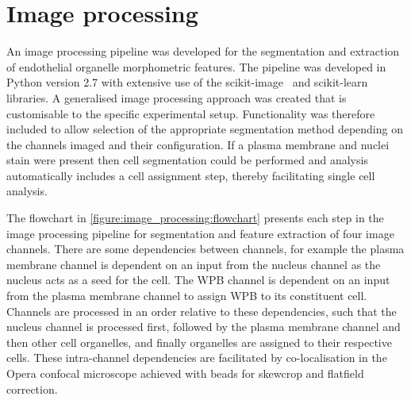 \section{Image processing}
\label{endothelial_morphometry:image_processing}
An image processing pipeline was developed for the segmentation and extraction of endothelial organelle morphometric features. The pipeline was developed in Python version 2.7 with extensive use of the scikit-image~\cite{VanderWalt2014} and scikit-learn~\cite{Pedregosa2011} libraries. A generalised image processing approach was created that is customisable to the specific experimental setup. Functionality was therefore included to allow selection of the appropriate segmentation method depending on the channels imaged and their configuration. If a plasma membrane and nuclei stain were present then cell segmentation could be performed and analysis automatically includes a cell assignment step, thereby facilitating single cell analysis.

The flowchart in \autoref{figure:image_processing:flowchart} presents each step in the image processing pipeline for segmentation and feature extraction of four image channels. There are some dependencies between channels, for example the plasma membrane channel is dependent on an input from the nucleus channel as the nucleus acts as a seed for the cell. The WPB channel is dependent on an input from the plasma membrane channel to assign WPB to its constituent cell. Channels are processed in an order relative to these dependencies, such that the nucleus channel is processed first, followed by the plasma membrane channel and then other cell organelles, and finally organelles are assigned to their respective cells. These intra-channel dependencies are facilitated by co-localisation in the Opera confocal microscope achieved with beads for skewcrop and flatfield correction.



